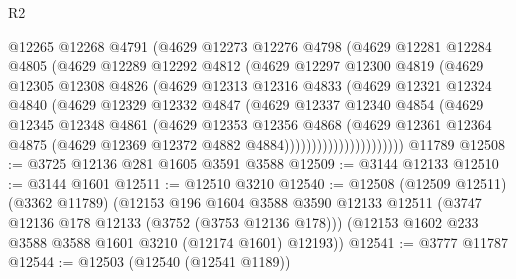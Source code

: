\begin{lexlean}{R2}
\begin{coremodule}
                      @12265
                      @12268
                      @4791
                      (@4629
                        @12273
                        @12276
                        @4798
                        (@4629
                          @12281
                          @12284
                          @4805
                          (@4629
                            @12289
                            @12292
                            @4812
                            (@4629
                              @12297
                              @12300
                              @4819
                              (@4629
                                @12305
                                @12308
                                @4826
                                (@4629
                                  @12313
                                  @12316
                                  @4833
                                  (@4629
                                    @12321
                                    @12324
                                    @4840
                                    (@4629
                                      @12329
                                      @12332
                                      @4847
                                      (@4629
                                        @12337
                                        @12340
                                        @4854
                                        (@4629
                                          @12345
                                          @12348
                                          @4861
                                          (@4629
                                            @12353
                                            @12356
                                            @4868
                                            (@4629
                                              @12361
                                              @12364
                                              @4875
                                              (@4629 @12369 @12372 @4882 @4884))))))))))))))))))))))
    @11789
@12508 := @3725 @12136 @281 @1605 @3591 @3588
@12509 := @3144 @12133
@12510 := @3144 @1601
@12511 := @12510 @3210
@12540 := @12508
    (@12509 @12511)
    (@3362 @11789)
    (@12153
      @196
      @1604
      @3588
      @3590
      @12133
      @12511
      (@3747 @12136 @178 @12133 (@3752 (@3753 @12136 @178)))
      (@12153 @1602 @233 @3588 @3588 @1601 @3210 (@12174 @1601) @12193))
@12541 := @3777 @11787
@12544 := @12503 (@12540 (@12541 @1189))

\end{coremodule}
\end{lexlean}
